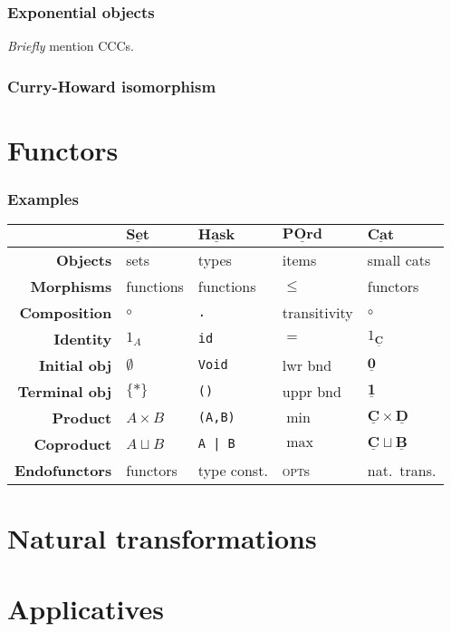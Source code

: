 \documentclass[10pt]{beamer}
\newcommand{\Cat}[1]{\ensuremath{\underline{\mathbf{#1}}}}
\theoremstyle{definition}
\theoremstyle{remark}
\numberwithin{equation}{section}
\begin{document}
\begin{frame}[fragile]
  \frametitle{Exponential objects}
  \emph{Briefly} mention CCCs.
\end{frame}

\begin{frame}[fragile]
  \frametitle{Curry-Howard isomorphism}
  
\end{frame}

\section{Functors}

\begin{frame}[fragile]
  \frametitle{Examples}
  \begin{tabular}{r l l l l}\toprule
    & $\Cat{Set}$ & $\Cat{Hask}$ & $\Cat{POrd}$ & $\Cat{Cat}$ \\\midrule
    \textbf{Objects} & sets & types & items & small cats \\
    \textbf{Morphisms} & functions & functions & $\leq$ & functors \\
    \textbf{Composition} & $\circ$ & \texttt{.} & transitivity & $\circ$ \\
    \textbf{Identity} & $1_A$ & \texttt{id} & $=$ & $1_{\Cat{C}}$ \\
    \textbf{Initial obj\rlap{.}} & $\emptyset$ & \texttt{Void} & lwr bnd & $\Cat{0}$ \\
    \textbf{Terminal obj\rlap{.}} & $\{*\}$ & \texttt{()} & uppr bnd & $\Cat{1}$ \\
    \textbf{Product} & $A \times B$ & \texttt{(A,B)} & $\min$ & $\Cat{C} \times \Cat{D}$ \\
    \textbf{Coproduct} & $A \sqcup B$ & \texttt{A | B} & $\max$ & $\Cat{C} \sqcup \Cat{B}$ \\
    \textbf{Endofunctors} & functors & type const. & \textsc{opt}s & nat.\ trans.\\\bottomrule
  \end{tabular}
\end{frame}

\section{Natural transformations}

\section{Applicatives}
\end{document}
